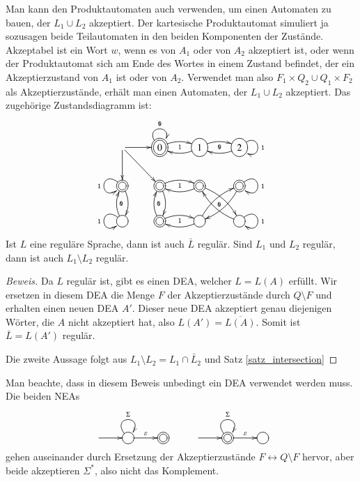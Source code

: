Man kann den Produktautomaten auch
verwenden, um einen Automaten zu bauen, der $L_1\cup L_2$
akzeptiert.
Der kartesische Produktautomat simuliert ja sozusagen
beide Teilautomaten in den beiden Komponenten der Zustände.
Akzeptabel ist ein Wort $w$, wenn es von $A_1$
oder von $A_2$ akzeptiert ist, oder wenn der Produktautomat
sich am Ende des Wortes in einem Zustand befindet, der ein
Akzeptierzustand von $A_1$ ist oder von $A_2$.
Verwendet
man also $F_1\times Q_2\cup Q_1\times F_2$ als Akzeptierzustände,
erhält man einen Automaten, der $L_1\cup L_2$ akzeptiert.
Das zugehörige Zustandsdiagramm ist:
\[
\entrymodifiers={++[o][F]}
\xymatrix{
*+\txt{} \ar[r] \ar[d] \ar[dr]
	&*++[o][F=]{0} \ar@/^/[r]_{\tt 1} \ar@(ul,ur)^{\tt 0}
		&{1} \ar@/^/[l] \ar@/^/[r]_{\tt 0}
			&{2}\ar@(ur,dr)^{\tt 1} \ar@/^/[l]
\\
*++[o][F=]{} \ar@/^/[d] \ar@(ul,dl)_{\tt 1}
	&*++[o][F=]{} \ar@/^/[d]{\tt 0} \ar@/^/[r]_{\tt 1}
		&*++[o][F=]{} \ar@/^/[l] \ar@/^/[dr]_{\tt 0}
			&*++[o][F=]{}\ar@(ur,dr)^{\tt 1} \ar@/^/[dl]
\\
{} \ar@/^/[u]_{\tt 0} \ar@(ul,dl)_{\tt 1}
	&*++[o][F=]{} \ar@/^/[u]_{\tt 0} \ar@/^/[r]_{\tt 1}
		&{} \ar@/^/[l] \ar@/^/[ur]
			&{}\ar@(ur,dr)^{\tt 1} \ar@/^/[ul]
}
\]

\begin{satz}
%
\label{satz_regcomplement}
Ist $L$ eine reguläre Sprache, dann ist auch $\bar L$ regulär.
Sind $L_1$ und $L_2$ regulär, dann ist auch $L_1\setminus L_2$
regulär.
\end{satz}

\begin{proof}[Beweis]
Da $L$ regulär ist, gibt es einen DEA, welcher $L=L(A)$ erfüllt.
Wir ersetzen in diesem DEA die Menge $F$ der Akzeptierzustände
durch $Q\setminus F$ und erhalten einen neuen DEA $A'$.
Dieser neue DEA akzeptiert genau diejenigen Wörter, die $A$ nicht
akzeptiert hat, also $L(A')=\overline{L(A)}$.
Somit ist $\bar L=L(A')$ regulär.

Die zweite Aussage folgt aus $L_1\setminus L_2=L_1\cap\bar L_2$ und
Satz \ref{satz_intersection}
\end{proof}
Man beachte, dass in diesem Beweis unbedingt ein DEA verwendet werden
muss.
Die beiden NEAs
\[
\entrymodifiers={++[o][F]}
\xymatrix{
*+\txt{}\ar[r]
	&{}\ar@(ul,ur)^{\Sigma} \ar[r]^{\varepsilon}
		&*++[o][F=]{}
&
*+\txt{}\ar[r]
	&*++[o][F=]{}\ar@(ul,ur)^{\Sigma} \ar[r]^{\varepsilon}
		&{}
}
\]
gehen auseinander durch Ersetzung der Akzeptierzustände
$F\leftrightarrow Q\setminus F$ hervor, aber beide akzeptieren
$\Sigma^*$, also nicht das Komplement.

